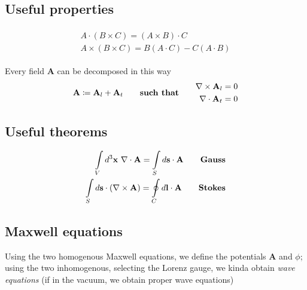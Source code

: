 \documentclass[a4paper, twocolumn]{article}
\begin{document}
\subsection{Useful properties}
\label{sec:useful-properties}
\begin{gather}
  \label{eq:37}
  \begin{split}
    A\cdot(B\times C)=(A\times B)\cdot C \\
    A\times(B\times C)=B(A\cdot C)-C(A\cdot B)
  \end{split}
\end{gather}

Every field $\mathbf{A}$ can be decomposed in this way
\begin{align*}
  \begin{aligned}
    \mathbf{A}\coloneqq\mathbf{A}_l+\mathbf{A}_t \\
  \end{aligned}
  \qquad \text{\textbf{such that}}\qquad 
  \begin{aligned}
    \nabla\times\mathbf{A}_l=0 \\
    \nabla\cdot\mathbf{A}_t =0\\
  \end{aligned}
\end{align*}

\subsection{Useful theorems}
\label{sec:useful-theorems}

\begin{gather}
  \label{eq:38}
  \begin{split}
    \int \displaylimits_V d^3\textbf{x}~ \nabla\cdot\mathbf{A}=\int\displaylimits_S d\mathbf{s}\cdot \mathbf{A} \qquad   \text{\textbf{Gauss}} \\
    \int\displaylimits_S d\mathbf{s}\cdot(\nabla\times \mathbf{A})=\oint\displaylimits_C d\mathbf{l}\cdot\mathbf{A} \qquad \text{\textbf{Stokes}}
  \end{split} 
\end{gather}

\subsection{Maxwell equations}
\label{sec:maxwell-equations}
Using the two homogenous Maxwell equations, we define the potentials $\mathbf{A}$ and $\phi$; using the two inhomogenous, selecting the Lorenz gauge, we kinda obtain \emph{wave equations} (if in the vacuum, we obtain proper wave equations)
\end{document}
